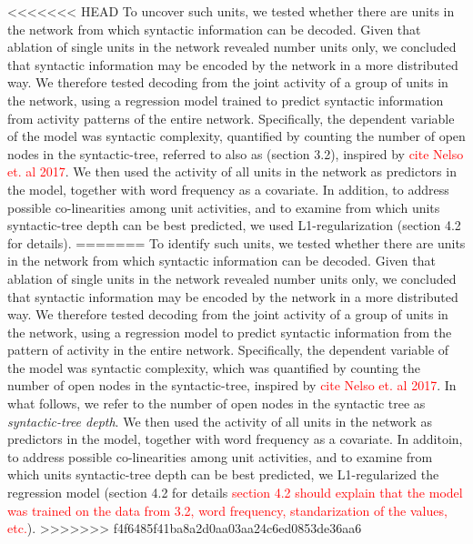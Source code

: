 <<<<<<< HEAD
To uncover such units, we tested whether there are units in the network from which syntactic information can be decoded. Given that ablation of single units in the network revealed number units only, we concluded that syntactic information may be encoded by the network in a more distributed way. We therefore tested decoding from the joint activity of a group of units in the network, using a regression model trained to predict syntactic information from activity patterns of the entire network. Specifically, the dependent variable of the model was syntactic complexity, quantified by counting the number of open nodes in the syntactic-tree, referred to also as  (section 3.2), inspired by \textcolor{red}{cite Nelso et. al 2017}. We then used the activity of all units in the network as predictors in the model, together with word frequency as a covariate. In addition, to address possible co-linearities among unit activities, and to examine from which units syntactic-tree depth can be best predicted, we used L1-regularization (section 4.2 for details). 
=======
To identify such units, we tested whether there are units in the network from which syntactic information can be decoded. Given that ablation of single units in the network revealed number units only, we concluded that syntactic information may be encoded by the network in a more distributed way. We therefore tested decoding from the joint activity of a group of units in the network, using a regression model to predict syntactic information from the pattern of activity in the entire network. Specifically, the dependent variable of the model was syntactic complexity, which was quantified by counting the number of open nodes in the syntactic-tree, inspired by \textcolor{red}{cite Nelso et. al 2017}. In what follows, we refer to the number of open nodes in the syntactic tree as \textit{syntactic-tree depth}. We then used the activity of all units in the network as predictors in the model, together with word frequency as a covariate. In additoin, to address possible co-linearities among unit activities, and to examine from which units syntactic-tree depth can be best predicted, we L1-regularized the regression model (section 4.2 for details \textcolor{red}{section 4.2 should explain that the model was trained on the data from 3.2, word frequency, standarization of the values, etc.}). 
>>>>>>> f4f6485f41ba8a2d0aa03aa24c6ed0853de36aa6

